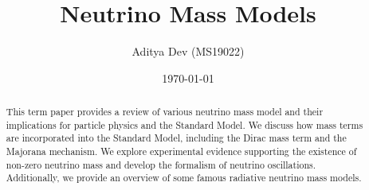 \documentclass[%
aapm,
 rmp,
 amsmath,amssymb,
 reprint,%
]{revtex4-2}
\begin{document}
\title[PHY655 TermPaper (Spring Semester 2023)]{Neutrino Mass Models}

\author{Aditya Dev \small (MS19022) }
%



\date{\today}%

\begin{abstract}
This term paper provides a  review of various neutrino mass model and their implications for particle physics and the Standard Model. We discuss how mass terms are incorporated into the Standard Model, including the Dirac mass term and the Majorana mechanism. We explore experimental evidence supporting the existence of non-zero neutrino mass and develop the formalism of neutrino oscillations. Additionally, we provide an overview of some famous radiative neutrino mass models. 
\end{abstract}

\maketitle
\tableofcontents
\vspace{20pt}
   

 
















\end{document}

